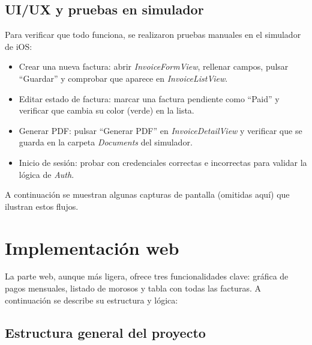 \subsection{UI/UX y pruebas en simulador}

\begin{large}

Para verificar que todo funciona, se realizaron pruebas manuales en el simulador de iOS:

\begin{itemize}
  \item Crear una nueva factura: abrir \textit{InvoiceFormView}, rellenar campos, pulsar “Guardar” y comprobar que aparece en \textit{InvoiceListView}.
  \item Editar estado de factura: marcar una factura pendiente como “Paid” y verificar que cambia su color (verde) en la lista.
  \item Generar PDF: pulsar “Generar PDF” en \textit{InvoiceDetailView} y verificar que se guarda en la carpeta \emph{Documents} del simulador.
  \item Inicio de sesión: probar con credenciales correctas e incorrectas para validar la lógica de \textit{Auth}.
\end{itemize}

A continuación se muestran algunas capturas de pantalla (omitidas aquí) que ilustran estos flujos.

\end{large}

\section{Implementación web}

\begin{large}

La parte web, aunque más ligera, ofrece tres funcionalidades clave: gráfica de pagos mensuales, listado de morosos y tabla con todas las facturas. A continuación se describe su estructura y lógica:

\end{large}

\subsection{Estructura general del proyecto}

